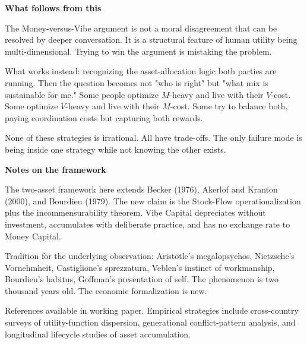 \documentclass[11pt]{article}
\begin{document}
\newpage

\noindent\textbf{What follows from this}

\medskip\noindent The Money-versus-Vibe argument is not a moral disagreement that can be resolved by deeper conversation. It is a structural feature of human utility being multi-dimensional. Trying to win the argument is mistaking the problem.

\medskip\noindent What works instead: recognizing the asset-allocation logic both parties are running. Then the question becomes not "who is right" but "what mix is sustainable for me." Some people optimize $M$-heavy and live with their $V$-cost. Some optimize $V$-heavy and live with their $M$-cost. Some try to balance both, paying coordination costs but capturing both rewards.

\medskip\noindent None of these strategies is irrational. All have trade-offs. The only failure mode is being inside one strategy while not knowing the other exists.

\vspace{0.5cm}
\noindent\textbf{Notes on the framework}

\noindent The two-asset framework here extends Becker (1976), Akerlof and Kranton (2000), and Bourdieu (1979). The new claim is the Stock-Flow operationalization plus the incommensurability theorem. Vibe Capital depreciates without investment, accumulates with deliberate practice, and has no exchange rate to Money Capital.

\noindent Tradition for the underlying observation: Aristotle's megalopsychos, Nietzsche's Vornehmheit, Castiglione's sprezzatura, Veblen's instinct of workmanship, Bourdieu's habitus, Goffman's presentation of self. The phenomenon is two thousand years old. The economic formalization is new.

\noindent References available in working paper. Empirical strategies include cross-country surveys of utility-function dispersion, generational conflict-pattern analysis, and longitudinal lifecycle studies of asset accumulation.
\end{document}
